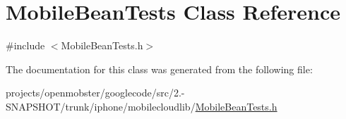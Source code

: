 \hypertarget{interface_mobile_bean_tests}{
\section{\-Mobile\-Bean\-Tests \-Class \-Reference}
\label{interface_mobile_bean_tests}
}


{\ttfamily \#include $<$\-Mobile\-Bean\-Tests.\-h$>$}



\-The documentation for this class was generated from the following file\-:\begin{DoxyCompactItemize}
\item 
projects/openmobster/googlecode/src/2.-\/\-S\-N\-A\-P\-S\-H\-O\-T/trunk/iphone/mobilecloudlib/\hyperlink{_mobile_bean_tests_8h}{\-Mobile\-Bean\-Tests.\-h}\end{DoxyCompactItemize}
